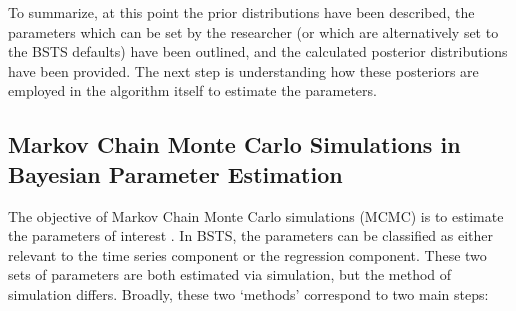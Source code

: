 To summarize, at this point the prior distributions have been described, the parameters which can be set by the researcher (or which are alternatively set to the BSTS defaults) have been outlined, and the calculated posterior distributions have been provided. The next step is understanding how these posteriors are employed in the algorithm itself to estimate the parameters.

\subsection {Markov Chain Monte Carlo Simulations in Bayesian Parameter Estimation}

The objective of Markov Chain Monte Carlo simulations (MCMC) is to estimate the parameters of interest \cite{robertcasella2004}. In BSTS, the parameters can be classified as either relevant to the time series component or the regression component. These two sets of parameters are both estimated via simulation, but the method of simulation differs. Broadly, these two `methods' correspond to two main steps:

